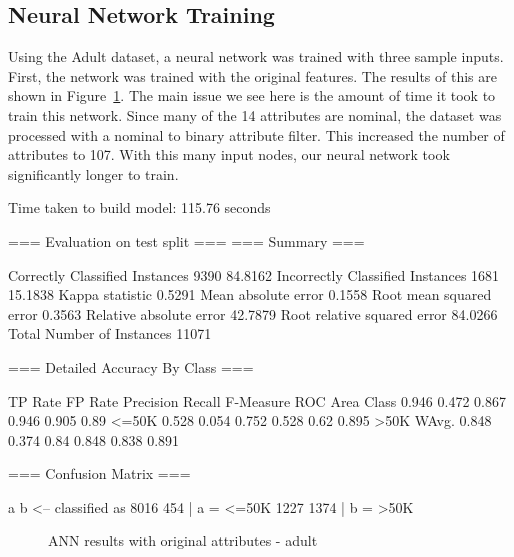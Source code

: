 \documentclass{sig-alternate}
\begin{document}


\subsection{Neural Network Training}

Using the Adult dataset, a neural network was trained with three sample inputs. First, the network was trained with the original features. The results of this are shown in Figure~\ref{ann-summary-original}. The main issue we see here is the amount of time it took to train this network. Since many of the 14 attributes are nominal, the dataset was processed with a nominal to binary attribute filter. This increased the number of attributes to 107. With this many input nodes, our neural network took significantly longer to train.


\tiny
\begin{verbbox}
Time taken to build model: 115.76 seconds

=== Evaluation on test split ===
=== Summary ===

Correctly Classified Instances        9390               84.8162 %
Incorrectly Classified Instances      1681               15.1838 %
Kappa statistic                          0.5291
Mean absolute error                      0.1558
Root mean squared error                  0.3563
Relative absolute error                 42.7879 %
Root relative squared error             84.0266 %
Total Number of Instances            11071     

=== Detailed Accuracy By Class ===

       TP Rate   FP Rate   Precision   Recall  F-Measure   ROC Area  Class
         0.946     0.472      0.867     0.946     0.905      0.89      <=50K
         0.528     0.054      0.752     0.528     0.62       0.895     >50K
WAvg.    0.848     0.374      0.84      0.848     0.838      0.891

=== Confusion Matrix ===

    a    b   <-- classified as
 8016  454 |    a =  <=50K
 1227 1374 |    b =  >50K
\end{verbbox}
\normalsize

\begin{figure}[!htbp]
    \centering
    \theverbbox
    \caption{ANN results with original attributes - adult\label{ann-summary-original}}
\end{figure}
\end{document}
